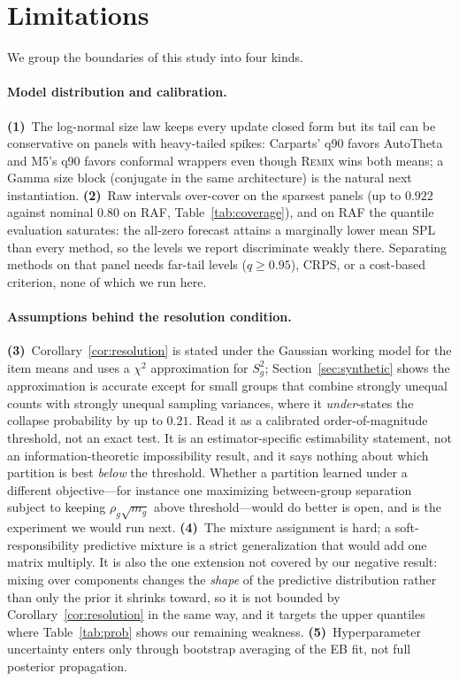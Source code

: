 \documentclass[twocolumn,10pt]{article}
\newcommand{\REMIX}{\textsc{Remix}}
\begin{document}
\section{Limitations}\label{sec:limitations}
We group the boundaries of this study into four kinds.

\paragraph{Model distribution and calibration.}
\textbf{(1)}~The log-normal size law keeps every update closed form but
its tail can be conservative on panels with heavy-tailed spikes:
Carparts' q90 favors AutoTheta and M5's q90 favors conformal wrappers
even though \REMIX{} wins both means; a Gamma size block (conjugate in
the same architecture) is the natural next instantiation.
\textbf{(2)}~Raw intervals over-cover on the sparsest panels (up to
$0.922$ against nominal $0.80$ on RAF, Table~\ref{tab:coverage}), and on
RAF the quantile evaluation saturates: the all-zero forecast attains a
marginally lower mean SPL than every method, so the levels we report
discriminate weakly there. Separating methods on that panel needs
far-tail levels ($q\ge0.95$), CRPS, or a cost-based criterion, none of
which we run here.

\paragraph{Assumptions behind the resolution condition.}
\textbf{(3)}~Corollary~\ref{cor:resolution} is stated under the Gaussian
working model for the item means and uses a $\chi^2$ approximation for
$S_g^2$; Section~\ref{sec:synthetic} shows the approximation is accurate
except for small groups that combine strongly unequal counts with
strongly unequal sampling variances, where it \emph{under}-states the
collapse probability by up to $0.21$. Read it as a calibrated
order-of-magnitude threshold, not an exact test. It is an
estimator-specific estimability statement, not an information-theoretic
impossibility result, and it says nothing about which partition is best
\emph{below} the threshold. Whether a partition learned under a
different objective---for instance one maximizing between-group
separation subject to keeping $\rho_g\sqrt{m_g}$ above threshold---would
do better is open, and is the experiment we would run next.
\textbf{(4)}~The mixture assignment is hard; a
soft-responsibility predictive mixture is a strict generalization that
would add one matrix multiply. It is also the one extension not covered
by our negative result: mixing over components changes the \emph{shape}
of the predictive distribution rather than only the prior it shrinks
toward, so it is not bounded by Corollary~\ref{cor:resolution} in the
same way, and it targets the upper quantiles where
Table~\ref{tab:prob} shows our remaining weakness. \textbf{(5)}~Hyperparameter uncertainty
enters only through bootstrap averaging of the EB fit, not full posterior
propagation.
\end{document}
